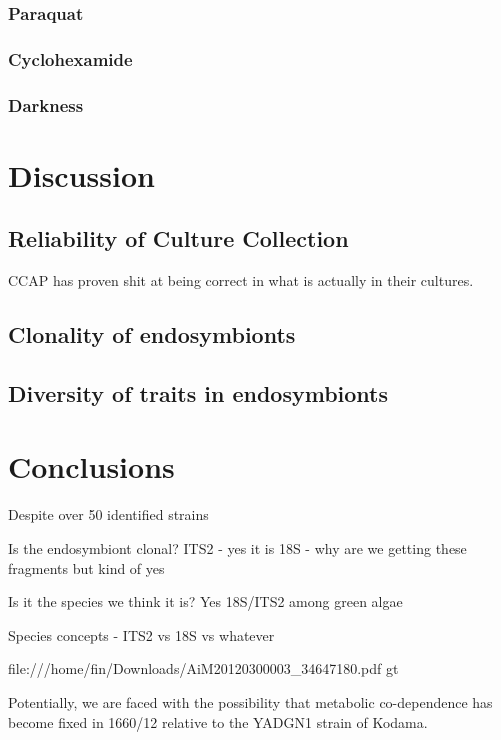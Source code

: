 \subsubsection{Paraquat}
\subsubsection{Cyclohexamide}
\subsubsection{Darkness}



\section{Discussion}

\subsection{Reliability of Culture Collection}

CCAP has proven shit at being correct in what is actually in their cultures. 



\subsection{Clonality of endosymbionts}



\subsection{Diversity of traits in endosymbionts}



\section{Conclusions}

Despite over 50 identified strains 


Is the endosymbiont clonal?
ITS2 - yes it is
18S - why are we getting these fragments but kind of yes

Is it the species we think it is?
Yes 18S/ITS2 among green algae

Species concepts  - ITS2 vs 18S vs whatever \citep{Boenigk2012}

file:///home/fin/Downloads/AiM20120300003_34647180.pdf
gt





Potentially, we are faced with the possibility that metabolic co-dependence has become fixed in 1660/12
relative to the YADGN1 strain of Kodama.


